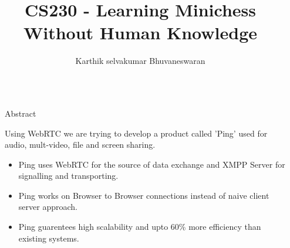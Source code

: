 \documentclass[final]{beamer}
\title{CS230 - Learning Minichess Without Human Knowledge} %
\author{Karthik selvakumar Bhuvaneswaran} %
\institute{karthik0@stanford.edu} %
\newlength{\sepwid}
\newlength{\onecolwid}
\begin{document}

\setlength{\belowcaptionskip}{2ex} %
\setlength\belowdisplayshortskip{2ex} %

\begin{frame}[t] %

\begin{columns}[t] %

\begin{column}{\sepwid}\end{column} %

\begin{column}{\onecolwid} %


\begin{alertblock}{Abstract}

Using WebRTC we are trying to develop a product called 'Ping' used for audio, mult-video, file and screen sharing.
\begin{itemize}
\item Ping uses WebRTC for the source of data exchange and XMPP Server for signalling and transporting.
\item Ping works on Browser to Browser connections instead of naive client server approach.
\item Ping guarentees high scalability and upto 60\% more efficiency than existing systems.
\end{itemize}

\end{alertblock}



\end{column}
\end{columns}
\end{frame}
\end{document}
